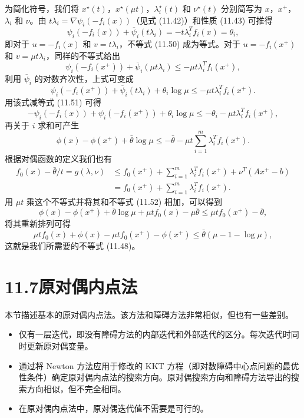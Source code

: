 \documentclass[UTF8,12pt,a4paper,fontset=fandol]{ctexart}
\begin{document}
为简化符号，我们将 $x^\star(t)$，$x^\star(\mu t)$，$\lambda_i^\star(t)$ 和 $\nu^\star(t)$ 分别简写为 $x$，$x^+$，$\lambda_i$ 和 $\nu$。由 $t\lambda_i=\nabla\psi_i(-f_i(x))$（见式 (11.42)）和性质 (11.43) 可推得
\begin{equation}
\psi_i(-f_i(x))+\overline{\psi}_i(t\lambda_i)=-t\lambda_i^Tf_i(x)=\theta_i,
\tag{11.51}
\end{equation}
即对于 $u=-f_i(x)$ 和 $v=t\lambda_i$，不等式 (11.50) 成为等式。对于 $u=-f_i(x^+)$ 和 $v=\mu t\lambda_i$，同样的不等式给出
\[
\psi_i(-f_i(x^+))+\overline{\psi}_i(\mu t\lambda_i)\leq -\mu t\lambda_i^Tf_i(x^+),
\]
利用 $\overline{\psi}_i$ 的对数齐次性，上式可变成
\[
\psi_i(-f_i(x^+))+\overline{\psi}_i(t\lambda_i)+\theta_i\log\mu\leq -\mu t\lambda_i^Tf_i(x^+).
\]
用该式减等式 (11.51) 可得
\[
-\psi_i(-f_i(x))+\psi_i(-f_i(x^+))+\theta_i\log\mu\leq -\theta_i-\mu t\lambda_i^Tf_i(x^+),
\]
再关于 $i$ 求和可产生
\begin{equation}
\phi(x)-\phi(x^+)+\bar{\theta}\log\mu\leq -\bar{\theta}-\mu t\sum_{i=1}^m\lambda_i^Tf_i(x^+).
\tag{11.52}
\end{equation}
根据对偶函数的定义我们也有
\[
\begin{aligned}
f_0(x)-\bar{\theta}/t=g(\lambda,\nu)
&\leq f_0(x^+)+\sum_{i=1}^m\lambda_i^Tf_i(x^+)+\nu^T(Ax^+-b)\\
&=f_0(x^+)+\sum_{i=1}^m\lambda_i^Tf_i(x^+).
\end{aligned}
\]
用 $\mu t$ 乘这个不等式并将其和不等式 (11.52) 相加，可以得到
\[
\phi(x)-\phi(x^+)+\bar{\theta}\log\mu+\mu tf_0(x)-\mu\bar{\theta}\leq \mu tf_0(x^+)-\bar{\theta},
\]
将其重新排列可得
\[
\mu tf_0(x)+\phi(x)-\mu tf_0(x^+)-\phi(x^+)\leq \bar{\theta}(\mu-1-\log\mu),
\]
这就是我们所需要的不等式 (11.48)。

\section*{11.7\quad 原对偶内点法}

本节描述基本的原对偶内点法。该方法和障碍方法非常相似，但也有一些差别。
\begin{itemize}
\item 仅有一层迭代，即没有障碍方法的内部迭代和外部迭代的区分。每次迭代时同时更新原对偶变量。
\item 通过将 Newton 方法应用于修改的 KKT 方程（即对数障碍中心点问题的最优性条件）确定原对偶内点法的搜索方向。原对偶搜索方向和障碍方法导出的搜索方向相似，但不完全相同。
\item 在原对偶内点法中，原对偶迭代值不需要是可行的。
\end{itemize}
\end{document}
